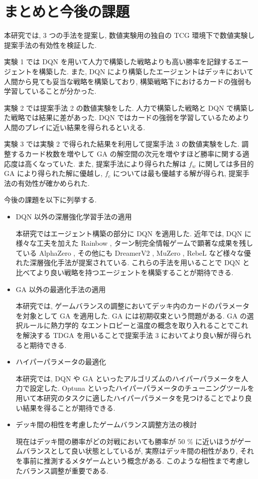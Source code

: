 \newpage
\changeindent{0cm}
\section{まとめと今後の課題}

本研究では, 3 つの手法を提案し, 数値実験用の独自の TCG 環境下で数値実験し提案手法の有効性を検証した.
\par
実験 1 では DQN を用いて人力で構築した戦略よりも高い勝率を記録するエージェントを構築した. また, DQN により構築したエージェントはデッキにおいて人間から見ても妥当な戦略を構築しており, 構築戦略下におけるカードの強弱も学習していることが分かった.
\par
実験 2 では提案手法 2 の数値実験をした. 人力で構築した戦略と DQN で構築した戦略では結果に差があった. DQN ではカードの強弱を学習しているためより人間のプレイに近い結果を得られるといえる.
\par
実験 3 では実験 2 で得られた結果を利用して提案手法 3 の数値実験をした. 調整するカード枚数を増やして GA の解空間の次元を増やすほど勝率に関する適応度は高くなっていた. 
また, 提案手法により得られた解は $f_w$ に関しては多目的 GA により得られた解に優越し, $f_c$ については最も優越する解が得られ, 提案手法の有効性が確かめられた.\par
今後の課題を以下に列挙する.
\begin{itemize}
  \item DQN 以外の深層強化学習手法の適用
  \par
  本研究ではエージェント構築の部分に DQN を適用した. 近年では, DQN に様々な工夫を加えた Rainbow \cite{Rainbow}, ターン制完全情報ゲームで顕著な成果を残している AlphaZero \cite{AlphaZero}, その他にも DreamerV2  \cite{DreamerV2}, MuZero \cite{MuZero}, RebeL \cite{ReBeL} など様々な優れた深層強化手法が提案されている. これらの手法を用いることで DQN と比べてより良い戦略を持つエージェントを構築することが期待できる.
  \item GA 以外の最適化手法の適用\par
  本研究では, ゲームバランスの調整においてデッキ内のカードのパラメータを対象として GA を適用した. GA には初期収束という問題がある. GA の選択ルールに熱力学的
  なエントロピーと温度の概念を取り入れることでこれを解決する TDGA \cite{TDGA} を用いることで提案手法 3 においてより良い解が得られると期待できる.
  \newpage
  \item ハイパーパラメータの最適化
  \par
  本研究では, DQN や GA といったアルゴリズムのハイパーパラメータを人力で設定した. Optuna \cite{Optuna} といったハイパーパラメータのチューニングツールを用いて本研究のタスクに適したハイパーパラメータを見つけることでより良い結果を得ることが期待できる.
  \item デッキ間の相性を考慮したゲームバランス調整方法の検討
  \par
  現在はデッキ間の勝率がどの対戦においても勝率が 50 \% に近いほうがゲームバランスとして良い状態としているが, 実際はデッキ間の相性があり, それを事前に推測するメタゲームという概念がある. このような相性まで考慮したバランス調整が重要である.
\end{itemize}




\changeindent{2cm}